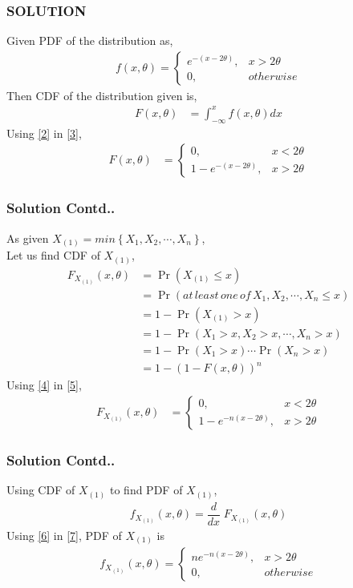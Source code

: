 \documentclass{beamer}
\providecommand{\pr}[1]{\ensuremath{\Pr\left(#1\right)}}
\providecommand{\pr}[1]{\ensuremath{\Pr\left(#1\right)}}
\providecommand{\fn}[1]{\ensuremath{f\left(#1\right)}}
\providecommand{\brak}[1]{\ensuremath{\left(#1\right)}}
\providecommand{\cbrak}[1]{\ensuremath{\left\{#1\right\}}}
\begin{document}
\begin{frame}
\frametitle{SOLUTION}
Given PDF of the distribution as,
\begin{align}
\fn{x,\theta}=
\begin{cases}
e^{-(x-2\theta)}, & x>2\theta
\\
0, & otherwise
\end{cases}\label{2}
\end{align}
Then CDF of the distribution given is,
\begin{align}
    F(x,\theta)&=\int_{-\infty}^x \fn{x,\theta} dx\label{3}
\end{align}
Using \eqref{2} in \eqref{3},
\begin{align}
F(x,\theta)&=
\begin{cases}
0, & x<2\theta
\\
1-e^{-(x-2\theta)}, & x>2\theta
\end{cases}\label{4}
\end{align}
\end{frame}

\begin{frame}
\frametitle{Solution Contd..}
As given $X_{(1)}=min\cbrak{X_1,X_2,\cdots,X_n}$,\\
Let us find CDF of $X_{(1)}$,
\begin{align}
  \nonumber  F_{X_{(1)}}(x,\theta)&=\pr{X_{(1)}\le x}\\
  \nonumber  &=\pr{at\,least\,one\, of\, X_1,X_2,\cdots,X_n \le x}\\
 \nonumber   &=1-\pr{X_{(1)}>x}\\
  \nonumber  &=1-\pr{X_1>x,X_2>x,\cdots,X_n>x}\\
  \nonumber &=1-\pr{X_1>x}\cdots \pr{X_n>x}\\
    &=1-\brak{1-F(x,\theta)}^n\label{5}
\end{align}
Using \eqref{4} in \eqref{5},
\begin{align}
F_{X_{(1)}}(x,\theta)&=
\begin{cases}
0, & x<2\theta
\\
1-e^{-n(x-2\theta)}, & x>2\theta
\end{cases}\label{6}
\end{align}
\end{frame}

\begin{frame}
\frametitle{Solution Contd..}
Using CDF of $X_{(1)}$ to find PDF of ${X_{(1)}}$,
\begin{align}
    f_{X_{(1)}}(x,\theta)= \dfrac{d}{dx}\;F_{X_{(1)}}(x,\theta)\label{7}
\end{align}
Using \eqref{6} in \eqref{7}, PDF of $X_{(1)}$ is
\begin{align}
f_{X_{(1)}}{(x,\theta)}=
\begin{cases}
n e^{-n(x-2\theta)}, & x>2\theta
\\
0, & otherwise
\end{cases}\label{8}
\end{align}
\end{frame}
\end{document}

